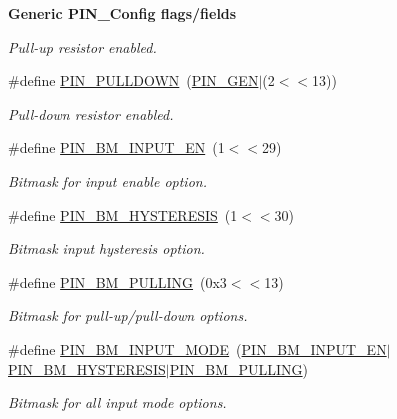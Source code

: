 \begin{Indent}{\bf Generic P\-I\-N\-\_\-\-Config flags/fields}
\begin{DoxyCompactItemize}
\begin{DoxyCompactList}\small\item\em Pull-\/up resistor enabled. \end{DoxyCompactList}\item 
\#define \hyperlink{_p_i_n_8h_a12b3efd67d32926ca0c310f95396de43}{P\-I\-N\-\_\-\-P\-U\-L\-L\-D\-O\-W\-N}~(\hyperlink{_p_i_n_8h_ae1f7e47a17caab9697e69e5b9aff270b}{P\-I\-N\-\_\-\-G\-E\-N}$|$(2$<$$<$13))
\begin{DoxyCompactList}\small\item\em Pull-\/down resistor enabled. \end{DoxyCompactList}\item 
\#define \hyperlink{_p_i_n_8h_aa0ed7bdcf3409fb2e8d2553bfa26ef35}{P\-I\-N\-\_\-\-B\-M\-\_\-\-I\-N\-P\-U\-T\-\_\-\-E\-N}~(1$<$$<$29)
\begin{DoxyCompactList}\small\item\em Bitmask for input enable option. \end{DoxyCompactList}\item 
\#define \hyperlink{_p_i_n_8h_a90670b834483d4047070f5f310998f29}{P\-I\-N\-\_\-\-B\-M\-\_\-\-H\-Y\-S\-T\-E\-R\-E\-S\-I\-S}~(1$<$$<$30)
\begin{DoxyCompactList}\small\item\em Bitmask input hysteresis option. \end{DoxyCompactList}\item 
\#define \hyperlink{_p_i_n_8h_a4f6a52f4c21a5ae30926e4d595ee9837}{P\-I\-N\-\_\-\-B\-M\-\_\-\-P\-U\-L\-L\-I\-N\-G}~(0x3$<$$<$13)
\begin{DoxyCompactList}\small\item\em Bitmask for pull-\/up/pull-\/down options. \end{DoxyCompactList}\item 
\#define \hyperlink{_p_i_n_8h_a3fe41a9595912571c21f68fa9d9585bb}{P\-I\-N\-\_\-\-B\-M\-\_\-\-I\-N\-P\-U\-T\-\_\-\-M\-O\-D\-E}~(\hyperlink{_p_i_n_8h_aa0ed7bdcf3409fb2e8d2553bfa26ef35}{P\-I\-N\-\_\-\-B\-M\-\_\-\-I\-N\-P\-U\-T\-\_\-\-E\-N}$|$\hyperlink{_p_i_n_8h_a90670b834483d4047070f5f310998f29}{P\-I\-N\-\_\-\-B\-M\-\_\-\-H\-Y\-S\-T\-E\-R\-E\-S\-I\-S}$|$\hyperlink{_p_i_n_8h_a4f6a52f4c21a5ae30926e4d595ee9837}{P\-I\-N\-\_\-\-B\-M\-\_\-\-P\-U\-L\-L\-I\-N\-G})
\begin{DoxyCompactList}\small\item\em Bitmask for all input mode options. \end{DoxyCompactList}\item 

\end{DoxyCompactItemize}
\end{Indent}
